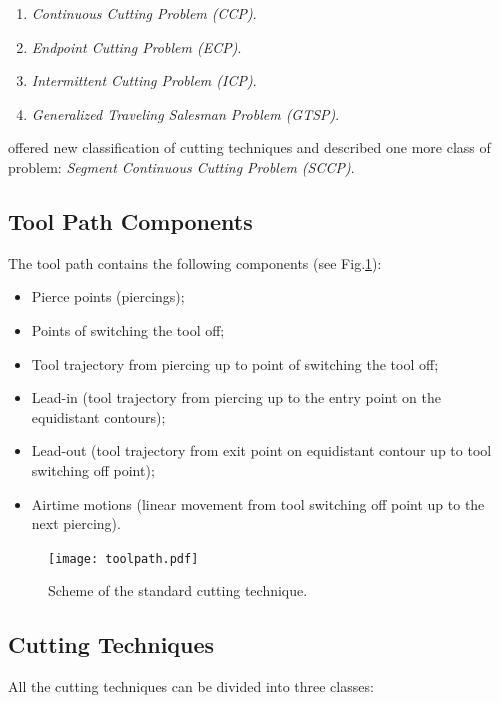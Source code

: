 \documentclass{../download/tPRS2e}
\begin{document}
\begin{enumerate}
\item \textit{Continuous Cutting Problem (CCP)}.
\item \textit{Endpoint Cutting Problem (ECP)}.
\item \textit{Intermittent Cutting Problem (ICP)}. 
\item \textit{Generalized Traveling Salesman Problem (GTSP)}.
\end{enumerate}

\cite{petunin_modeling_2015} offered new classification of cutting techniques and described one more class of problem:
\textit{Segment Continuous Cutting Problem (SCCP)}.

\subsection{Tool Path Components}

The tool path contains the following components (see Fig.\ref{toolpath}):

\begin{itemize}
\item Pierce points (piercings);
\item Points of switching the tool off;
\item Tool trajectory from piercing up to point of switching the tool off; 
\item Lead-in (tool trajectory from piercing up to the entry point on the equidistant contours); 
\item Lead-out (tool trajectory from exit point on equidistant contour up to tool switching off point); 
\item Airtime motions (linear movement from tool switching off point up to the next piercing).
\end{itemize}

\begin{figure}
\begin{center}
\texttt{[image: toolpath.pdf]}
\caption{Scheme of the standard cutting technique.} \label{toolpath}
\end{center}
\end{figure}


\subsection{Cutting Techniques}

All the cutting techniques can be divided into three classes:
\end{document}
